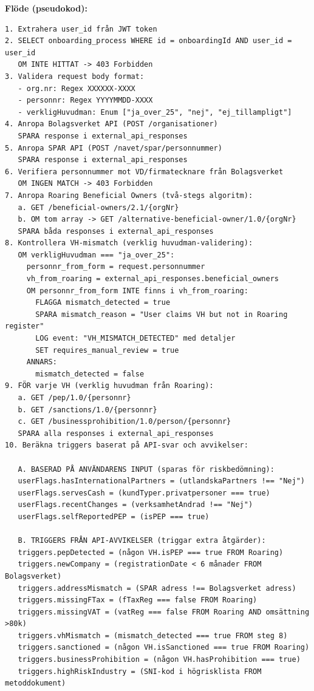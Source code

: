 \documentclass[12pt,a4paper]{article}
\begin{document}
\textbf{Flöde (pseudokod):}
\begin{lstlisting}
1. Extrahera user_id från JWT token
2. SELECT onboarding_process WHERE id = onboardingId AND user_id = user_id
   OM INTE HITTAT -> 403 Forbidden
3. Validera request body format:
   - org.nr: Regex XXXXXX-XXXX
   - personnr: Regex YYYYMMDD-XXXX
   - verkligHuvudman: Enum ["ja_over_25", "nej", "ej_tillampligt"]
4. Anropa Bolagsverket API (POST /organisationer)
   SPARA response i external_api_responses
5. Anropa SPAR API (POST /navet/spar/personnummer)
   SPARA response i external_api_responses
6. Verifiera personnummer mot VD/firmatecknare från Bolagsverket
   OM INGEN MATCH -> 403 Forbidden
7. Anropa Roaring Beneficial Owners (två-stegs algoritm):
   a. GET /beneficial-owners/2.1/{orgNr}
   b. OM tom array -> GET /alternative-beneficial-owner/1.0/{orgNr}
   SPARA båda responses i external_api_responses
8. Kontrollera VH-mismatch (verklig huvudman-validering):
   OM verkligHuvudman === "ja_over_25":
     personnr_from_form = request.personnummer
     vh_from_roaring = external_api_responses.beneficial_owners
     OM personnr_from_form INTE finns i vh_from_roaring:
       FLAGGA mismatch_detected = true
       SPARA mismatch_reason = "User claims VH but not in Roaring register"
       LOG event: "VH_MISMATCH_DETECTED" med detaljer
       SET requires_manual_review = true
     ANNARS:
       mismatch_detected = false
9. FÖR varje VH (verklig huvudman från Roaring):
   a. GET /pep/1.0/{personnr}
   b. GET /sanctions/1.0/{personnr}
   c. GET /businessprohibition/1.0/person/{personnr}
   SPARA alla responses i external_api_responses
10. Beräkna triggers baserat på API-svar och avvikelser:
   
   A. BASERAD PÅ ANVÄNDARENS INPUT (sparas för riskbedömning):
   userFlags.hasInternationalPartners = (utlandskaPartners !== "Nej")
   userFlags.servesCash = (kundTyper.privatpersoner === true)
   userFlags.recentChanges = (verksamhetAndrad !== "Nej")
   userFlags.selfReportedPEP = (isPEP === true)
   
   B. TRIGGERS FRÅN API-AVVIKELSER (triggar extra åtgärder):
   triggers.pepDetected = (någon VH.isPEP === true FROM Roaring)
   triggers.newCompany = (registrationDate < 6 månader FROM Bolagsverket)
   triggers.addressMismatch = (SPAR adress !== Bolagsverket adress)
   triggers.missingFTax = (fTaxReg === false FROM Roaring)
   triggers.missingVAT = (vatReg === false FROM Roaring AND omsättning >80k)
   triggers.vhMismatch = (mismatch_detected === true FROM steg 8)
   triggers.sanctioned = (någon VH.isSanctioned === true FROM Roaring)
   triggers.businessProhibition = (någon VH.hasProhibition === true)
   triggers.highRiskIndustry = (SNI-kod i högrisklista FROM metoddokument)
   

\end{lstlisting}
\end{document}

